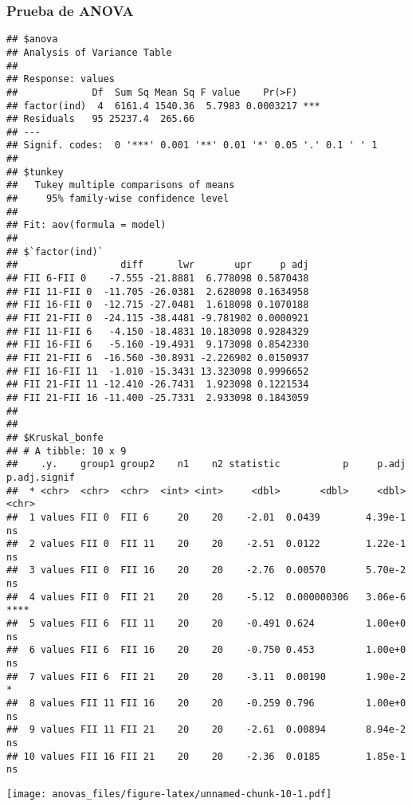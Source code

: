 \documentclass[
]{article}
\begin{document}
\hypertarget{prueba-de-anova-4}{%
\subsubsection{Prueba de ANOVA}\label{prueba-de-anova-4}}

\begin{verbatim}
## $anova
## Analysis of Variance Table
## 
## Response: values
##             Df  Sum Sq Mean Sq F value    Pr(>F)    
## factor(ind)  4  6161.4 1540.36  5.7983 0.0003217 ***
## Residuals   95 25237.4  265.66                      
## ---
## Signif. codes:  0 '***' 0.001 '**' 0.01 '*' 0.05 '.' 0.1 ' ' 1
## 
## $tunkey
##   Tukey multiple comparisons of means
##     95% family-wise confidence level
## 
## Fit: aov(formula = model)
## 
## $`factor(ind)`
##                  diff      lwr       upr     p adj
## FII 6-FII 0    -7.555 -21.8881  6.778098 0.5870438
## FII 11-FII 0  -11.705 -26.0381  2.628098 0.1634958
## FII 16-FII 0  -12.715 -27.0481  1.618098 0.1070188
## FII 21-FII 0  -24.115 -38.4481 -9.781902 0.0000921
## FII 11-FII 6   -4.150 -18.4831 10.183098 0.9284329
## FII 16-FII 6   -5.160 -19.4931  9.173098 0.8542330
## FII 21-FII 6  -16.560 -30.8931 -2.226902 0.0150937
## FII 16-FII 11  -1.010 -15.3431 13.323098 0.9996652
## FII 21-FII 11 -12.410 -26.7431  1.923098 0.1221534
## FII 21-FII 16 -11.400 -25.7331  2.933098 0.1843059
## 
## 
## $Kruskal_bonfe
## # A tibble: 10 x 9
##    .y.    group1 group2    n1    n2 statistic           p     p.adj p.adj.signif
##  * <chr>  <chr>  <chr>  <int> <int>     <dbl>       <dbl>     <dbl> <chr>       
##  1 values FII 0  FII 6     20    20    -2.01  0.0439        4.39e-1 ns          
##  2 values FII 0  FII 11    20    20    -2.51  0.0122        1.22e-1 ns          
##  3 values FII 0  FII 16    20    20    -2.76  0.00570       5.70e-2 ns          
##  4 values FII 0  FII 21    20    20    -5.12  0.000000306   3.06e-6 ****        
##  5 values FII 6  FII 11    20    20    -0.491 0.624         1.00e+0 ns          
##  6 values FII 6  FII 16    20    20    -0.750 0.453         1.00e+0 ns          
##  7 values FII 6  FII 21    20    20    -3.11  0.00190       1.90e-2 *           
##  8 values FII 11 FII 16    20    20    -0.259 0.796         1.00e+0 ns          
##  9 values FII 11 FII 21    20    20    -2.61  0.00894       8.94e-2 ns          
## 10 values FII 16 FII 21    20    20    -2.36  0.0185        1.85e-1 ns
\end{verbatim}

\texttt{[image: anovas\_files/figure-latex/unnamed-chunk-10-1.pdf]}
\end{document}
